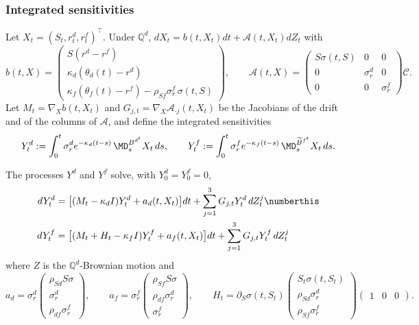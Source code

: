 \subsubsection{Integrated sensitivities}
Let $X_t=(S_t,r^d_t,r^f_t)^\top$. Under $\mathbb{Q}^d$, $dX_t=b(t,X_t)dt+\mathcal{A}(t,X_t)dZ_t$ with
$$ b(t,X)=\begin{pmatrix} S(r^d-r^f)\\ \kappa_d(\theta_d(t)-r^d)\\ \kappa_f(\theta_f(t)-r^f)-\rho_{Sf}\sigma^f_r\,\sigma(t,S)\end{pmatrix},\qquad
\mathcal{A}(t,X)=\begin{pmatrix} S\sigma(t,S)&0&0\\ 0&\sigma^d_r&0\\ 0&0&\sigma^f_r\end{pmatrix}\mathcal{C}. $$
Let $M_t=\nabla_Xb(t,X_t)$ and $G_{j,t}=\nabla_X\mathcal{A}_{\cdot j}(t,X_t)$ be the Jacobians of the drift and of the columns of $\mathcal{A}$, and define the integrated sensitivities
\begin{equation}\label{eq: integratedSensitivities}
Y^d_t:=\int_0^t\sigma^d_re^{-\kappa_d(t-s)}\,\MD^{B^{d^t}}_sX_t\,ds,\qquad
Y^f_t:=\int_0^t\sigma^f_re^{-\kappa_f(t-s)}\,\MD^{\widetilde{B}^{f^t}}_sX_t\,ds .
\end{equation}
\begin{prop}\label{prop: integratedSensitivities}
The processes $Y^d$ and $Y^f$ solve, with $Y^d_0=Y^f_0=0$,
\begin{align*}
dY_t^d &=\big[(M_t-\kappa_d I)Y_t^d+a_d(t,X_t)\big]dt +\sum_{j=1}^3G_{j,t}Y_t^d\,dZ_t^j \numberthis\label{eq: matrixSystem}\\
dY_t^f &=\big[(M_t+H_t-\kappa_f I)Y_t^f+a_f(t,X_t)\big]dt +\sum_{j=1}^3G_{j,t}Y_t^f\,dZ_t^j
\end{align*}
where $Z$ is the $\mathbb{Q}^d$-Brownian motion and
$$ a_d=\sigma^d_r\begin{pmatrix}\rho_{Sd}S\sigma\\ \sigma^d_r\\ \rho_{df}\sigma^f_r\end{pmatrix},\qquad
a_f=\sigma^f_r\begin{pmatrix}\rho_{Sf}S\sigma\\ \rho_{df}\sigma^d_r\\ \sigma^f_r\end{pmatrix},\qquad
H_t=\partial_S\sigma(t,S_t)\begin{pmatrix}S_t\sigma(t,S_t)\\ \rho_{Sd}\sigma^d_r\\ \rho_{Sf}\sigma^f_r\end{pmatrix}\begin{pmatrix}1&0&0\end{pmatrix}. $$
\end{prop}
